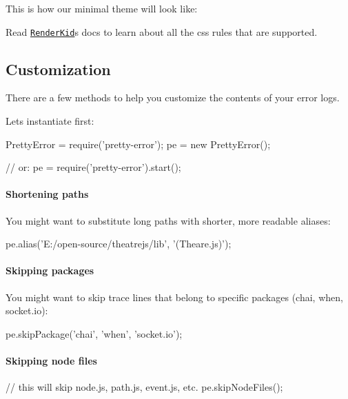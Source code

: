 This is how our minimal theme will look like\+: 

Read \href{https://github.com/AriaMinaei/renderkid}{\tt Render\+Kid}\textquotesingle{}s docs to learn about all the css rules that are supported.

\subsection*{Customization}

There are a few methods to help you customize the contents of your error logs.

Let\textquotesingle{}s instantiate first\+:


\begin{DoxyCode}
PrettyError = require('pretty-error');
pe = new PrettyError();

// or:
pe = require('pretty-error').start();
\end{DoxyCode}


\paragraph*{Shortening paths}

You might want to substitute long paths with shorter, more readable aliases\+:


\begin{DoxyCode}
pe.alias('E:/open-source/theatrejs/lib', '(Theare.js)');
\end{DoxyCode}


\paragraph*{Skipping packages}

You might want to skip trace lines that belong to specific packages (chai, when, socket.\+io)\+:


\begin{DoxyCode}
pe.skipPackage('chai', 'when', 'socket.io');
\end{DoxyCode}


\paragraph*{Skipping node files}


\begin{DoxyCode}
// this will skip node.js, path.js, event.js, etc.
pe.skipNodeFiles();
\end{DoxyCode}


